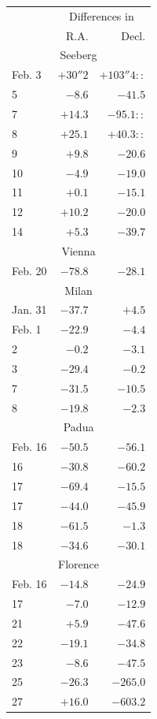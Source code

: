 \begin{center}
\begin{tabular}{l|r|r}
& \multicolumn{2}{c}{Differences in} \\
& R.A. & Decl. \\
\multicolumn{3}{c}{Seeberg} \\
Feb. 3 & $+30''2$ & $+103''4\!::$ \\
5 & $-8.6$ & $-41.5$ \\
7 & $+14.3$ & $-95.1\!::$ \\
8 & $+25.1$ & $+40.3\!::$ \\
9 & $+9.8$ & $-20.6$ \\
10 & $-4.9$ & $-19.0$ \\
11 & $+0.1$ & $-15.1$ \\
12 & $+10.2$ & $-20.0$ \\
14 & $+5.3$ & $-39.7$ \\
\multicolumn{3}{c}{Vienna} \\
Feb. 20 & $-78.8$ & $-28.1$ \\
\multicolumn{3}{c}{Milan} \\
Jan. 31 & $-37.7$ & $+4.5$ \\
Feb. 1 & $-22.9$ & $-4.4$ \\
2 & $-0.2$ & $-3.1$ \\
3 & $-29.4$ & $-0.2$ \\
7 & $-31.5$ & $-10.5$ \\
8 & $-19.8$ & $-2.3$ \\
\multicolumn{3}{c}{Padua} \\
Feb. 16 & $-50.5$ & $-56.1$ \\
16 & $-30.8$ & $-60.2$ \\
17 & $-69.4$ & $-15.5$ \\
17 & $-44.0$ & $-45.9$ \\
18 & $-61.5$ & $-1.3$ \\
18 & $-34.6$ & $-30.1$ \\
\multicolumn{3}{c}{Florence} \\
Feb. 16 & $-14.8$ & $-24.9$ \\
17 & $-7.0$ & $-12.9$ \\
21 & $+5.9$ & $-47.6$ \\
22 & $-19.1$ & $-34.8$ \\
23 & $-8.6$ & $-47.5$ \\
25 & $-26.3$ & $-265.0$ \\
27 & $+16.0$ & $-603.2$ \\
\end{tabular}
\end{center}
